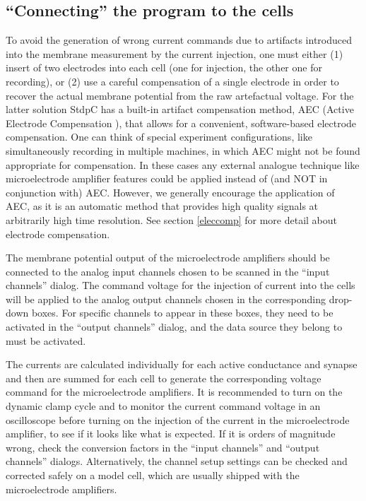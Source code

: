 \documentclass{article}
\begin{document}
\subsection{``Connecting'' the program to the cells}
 
To avoid the generation of wrong current commands due to artifacts
introduced into the membrane measurement by the current injection,
one must either (1) insert of two electrodes into each cell (one for
injection, the other one for recording), or
(2) use a careful compensation of a single electrode in order to recover the
actual membrane potential from the raw artefactual voltage. For the
latter solution StdpC has a built-in artifact compensation method, AEC
(Active Electrode Compensation \cite{Brette2008}), that allows for a
convenient, software-based electrode compensation. One can think of
special experiment configurations, like simultaneously recording in multiple
machines, in which AEC might not be found appropriate for compensation. In
these cases any external analogue technique like microelectrode amplifier 
features could
be applied instead of (and NOT in conjunction with) AEC. However, we
generally encourage the application of AEC, as it is an automatic method
that provides high quality signals at arbitrarily high time resolution.
See section \ref{eleccomp} for more detail about electrode compensation.

The membrane potential output of the microelectrode amplifiers should
be connected to the analog input channels chosen to be scanned in the
``input channels'' dialog. The command voltage for the injection of
current into the cells will be applied to the analog output channels chosen in
the corresponding drop-down boxes. For specific channels to appear in
these boxes, they need to be activated in the ``output channels''
dialog, and the data source they belong to must be activated.

The currents are calculated individually for each active conductance and
synapse and then are summed for each cell to generate the
corresponding voltage command for the microelectrode amplifiers. It is
recommended to turn on the dynamic clamp cycle and to monitor the
current command voltage in an oscilloscope before turning on the
injection of the current in the microelectrode amplifier, to see if it
looks like what is expected. If it is orders of magnitude wrong, check
the conversion factors in the ``input channels'' and ``output
channels'' dialogs. Alternatively, the channel setup settings can be checked and
corrected safely on a model cell, which are usually shipped with the
microelectrode amplifiers.
\end{document}
